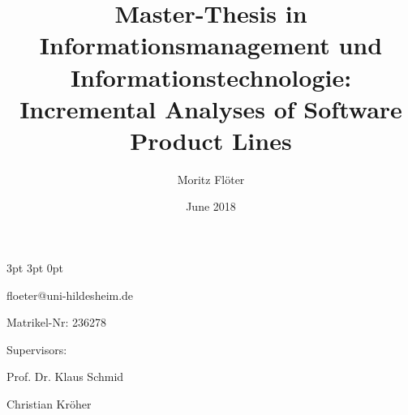 \documentclass[a4paper]{article}
\title{\large Master-Thesis in Informationsmanagement und Informationstechnologie: \\ \Huge Incremental Analyses of Software Product Lines}
\author{Moritz Fl\"oter}
\date{June 2018}
\begin{document}


  {3pt}%
  {3pt}%
  {\normalfont}%
  {0pt}%
  {\bfseries}%
  {}%
  {\newline}%
  {}%

\theoremstyle{mystyle}


\newtheorem{req}{REQ}
\newtheorem{subreq}{REQ}[req]
\newtheorem{subsubreq}{REQ}[subreq]
\setcounter{req}{0}

\newcommand*{\reqtable}[4]{
\begin{tabular}{ | p{0.15\textwidth} | p{0.79\textwidth} | }
	\hline
	\textit{Priority} & \begin{minipage}[l]{0.79\textwidth}
	\vspace{0.25em}
		#1
	\vspace{0.25em}
	\end{minipage} \\ \hline
	\textit{Source} & \begin{minipage}[l]{0.79\textwidth}
	\vspace{0.25em}
		#2
	\vspace{0.25em}
	\end{minipage}\\ \hline
	\textit{Description} & \begin{minipage}[l]{0.79\textwidth}
	\vspace{0.25em}
		#3
	\vspace{0.25em}
	\end{minipage} \\ \hline
	\textit{Explanation} & \begin{minipage}[l]{0.79\textwidth} 
	\vspace{0.25em}
		#4
	\vspace{0.25em}
	\end{minipage} \\
	\hline
\end{tabular}
}



\maketitle
\newblock

\begin{center}
floeter@uni-hildesheim.de \par
Matrikel-Nr: 236278 \par
Supervisors: \par
Prof. Dr. Klaus Schmid \par
Christian Kr\"oher
\end{center}
\end{document}

